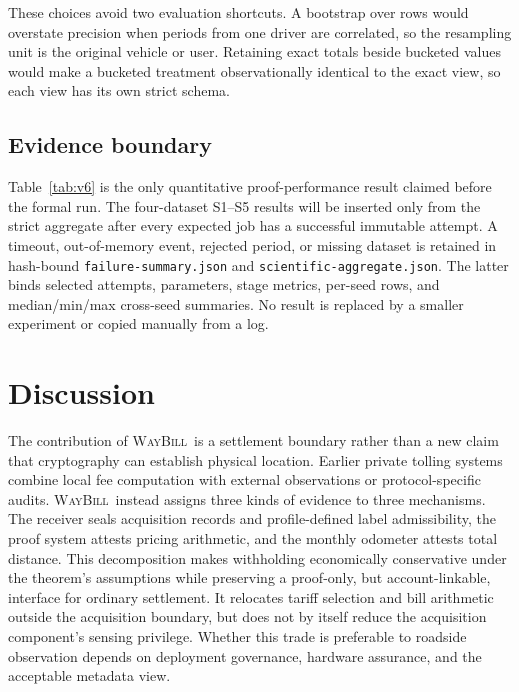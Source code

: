\documentclass[conference]{IEEEtran}
\theoremstyle{plain}
\theoremstyle{definition}
\newcommand{\system}{\textsc{WayBill}}
\begin{document}
These choices avoid two evaluation shortcuts. A bootstrap over rows would
overstate precision when periods from one driver are correlated, so the
resampling unit is the original vehicle or user. Retaining exact totals beside
bucketed values would make a bucketed treatment observationally identical to
the exact view, so each view has its own strict schema.

\subsection{Evidence boundary}
Table~\ref{tab:v6} is the only quantitative proof-performance result claimed
before the formal run. The four-dataset S1--S5 results will be inserted only
from the strict aggregate after every expected job has a successful immutable
attempt. A timeout, out-of-memory event, rejected period, or missing dataset is
retained in hash-bound \texttt{failure-summary.json} and
\texttt{scientific-aggregate.json}. The latter binds selected attempts,
parameters, stage metrics, per-seed rows, and median/min/max cross-seed summaries.
No result is replaced by a smaller experiment or copied manually from a log.


\section{Discussion}

The contribution of \system\ is a settlement boundary rather than a new claim
that cryptography can establish physical location. Earlier private tolling
systems combine local fee computation with external observations or
protocol-specific audits. \system\ instead assigns three kinds of evidence to
three mechanisms. The receiver seals acquisition records and profile-defined
label admissibility, the proof system
attests pricing arithmetic, and the monthly odometer attests total distance.
This decomposition makes withholding economically conservative under the
theorem's assumptions while preserving a proof-only, but account-linkable,
interface for ordinary settlement. It relocates tariff selection and bill
arithmetic outside the acquisition boundary, but does not by itself reduce the
acquisition component's sensing privilege. Whether this trade is preferable to roadside
observation depends on deployment governance, hardware assurance, and the
acceptable metadata view.
\end{document}
